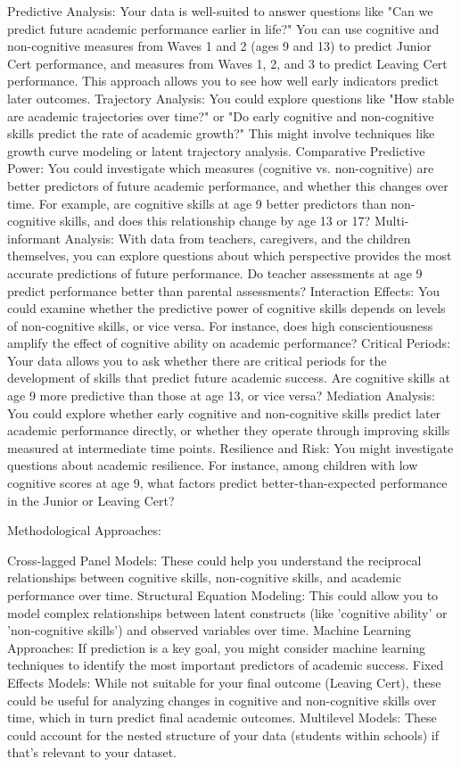 \documentclass[12pt,a4paper,onecolumn]{article}
\numberwithin{equation}{section}
\begin{document}
\clearpage


Predictive Analysis:
Your data is well-suited to answer questions like "Can we predict future academic performance earlier in life?" You can use cognitive and non-cognitive measures from Waves 1 and 2 (ages 9 and 13) to predict Junior Cert performance, and measures from Waves 1, 2, and 3 to predict Leaving Cert performance. This approach allows you to see how well early indicators predict later outcomes.
Trajectory Analysis:
You could explore questions like "How stable are academic trajectories over time?" or "Do early cognitive and non-cognitive skills predict the rate of academic growth?" This might involve techniques like growth curve modeling or latent trajectory analysis.
Comparative Predictive Power:
You could investigate which measures (cognitive vs. non-cognitive) are better predictors of future academic performance, and whether this changes over time. For example, are cognitive skills at age 9 better predictors than non-cognitive skills, and does this relationship change by age 13 or 17?
Multi-informant Analysis:
With data from teachers, caregivers, and the children themselves, you can explore questions about which perspective provides the most accurate predictions of future performance. Do teacher assessments at age 9 predict performance better than parental assessments?
Interaction Effects:
You could examine whether the predictive power of cognitive skills depends on levels of non-cognitive skills, or vice versa. For instance, does high conscientiousness amplify the effect of cognitive ability on academic performance?
Critical Periods:
Your data allows you to ask whether there are critical periods for the development of skills that predict future academic success. Are cognitive skills at age 9 more predictive than those at age 13, or vice versa?
Mediation Analysis:
You could explore whether early cognitive and non-cognitive skills predict later academic performance directly, or whether they operate through improving skills measured at intermediate time points.
Resilience and Risk:
You might investigate questions about academic resilience. For instance, among children with low cognitive scores at age 9, what factors predict better-than-expected performance in the Junior or Leaving Cert?

Methodological Approaches:

Cross-lagged Panel Models: These could help you understand the reciprocal relationships between cognitive skills, non-cognitive skills, and academic performance over time.
Structural Equation Modeling: This could allow you to model complex relationships between latent constructs (like 'cognitive ability' or 'non-cognitive skills') and observed variables over time.
Machine Learning Approaches: If prediction is a key goal, you might consider machine learning techniques to identify the most important predictors of academic success.
Fixed Effects Models: While not suitable for your final outcome (Leaving Cert), these could be useful for analyzing changes in cognitive and non-cognitive skills over time, which in turn predict final academic outcomes.
Multilevel Models: These could account for the nested structure of your data (students within schools) if that's relevant to your dataset.
\end{document}
